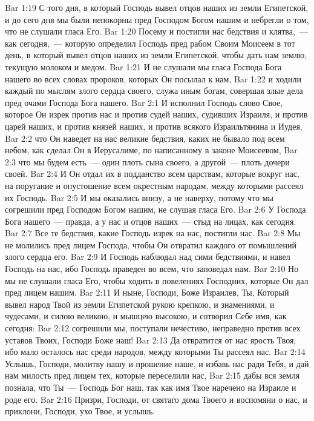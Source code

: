\vs Bar 1:19 С того дня, в который Господь вывел отцов наших из земли Египетской, и до сего дня мы были непокорны пред Господом Богом нашим и небрегли о том, что не слушали гласа Его.
\vs Bar 1:20 Посему и постигли нас бедствия и клятва,~--- как сегодня,~--- которую определил Господь пред рабом Своим Моисеем в тот день, в который вывел отцов наших из земли Египетской, чтобы дать нам землю, текущую молоком и медом.
\vs Bar 1:21 И не слушали мы гласа Господа Бога нашего во всех словах пророков, которых Он посылал к нам,
\vs Bar 1:22 и ходили каждый по мыслям злого сердца своего, служа иным богам, совершая злые дела пред очами Господа Бога нашего.
\vs Bar 2:1 И исполнил Господь слово Свое, которое Он изрек против нас и против судей наших, судивших Израиля, и против царей наших, и против князей наших, и против всякого Израильтянина и Иудея,
\vs Bar 2:2 что Он наведет на нас великие бедствия, каких не бывало под всем небом, как сделал Он в Иерусалиме, по написанному в законе Моисеевом,
\vs Bar 2:3 что мы будем есть~--- один плоть сына своего, а другой~--- плоть дочери своей.
\vs Bar 2:4 И Он отдал их в подданство всем царствам, которые вокруг нас, на поругание и опустошение всем окрестным народам, между которыми рассеял их Господь.
\vs Bar 2:5 И мы оказались внизу, а не наверху, потому что мы согрешили пред Господом Богом нашим, не слушая гласа Его.
\vs Bar 2:6 У Господа Бога нашего~--- правда, а у нас и отцов наших~--- стыд на лицах, как сегодня.
\vs Bar 2:7 Все те бедствия, какие Господь изрек на нас, постигли нас.
\vs Bar 2:8 Мы не молились пред лицем Господа, чтобы Он отвратил каждого от помышлений злого сердца его.
\vs Bar 2:9 И Господь наблюдал над сими бедствиями, и навел  Господь на нас, ибо Господь праведен во всем, что заповедал нам.
\vs Bar 2:10 Но мы не слушали гласа Его, чтобы ходить в повелениях Господних, которые Он дал пред лицем нашим.
\vs Bar 2:11 И ныне, Господи, Боже Израилев, Ты, Который вывел народ Твой из земли Египетской рукою крепкою, и знамениями, и чудесами, и силою великою, и мышцею высокою, и сотворил Себе имя, как сегодня:
\vs Bar 2:12 согрешили мы, поступали нечестиво, неправедно против всех уставов Твоих, Господи Боже наш!
\vs Bar 2:13 Да отвратится от нас ярость Твоя, ибо мало осталось нас среди народов, между которыми Ты рассеял нас.
\vs Bar 2:14 Услышь, Господи, молитву нашу и прошение наше, и избавь нас ради Тебя, и дай нам милость пред лицем тех, которые переселили нас,
\vs Bar 2:15 дабы вся земля познала, что Ты~--- Господь Бог наш, так как имя Твое наречено на Израиле и роде его.
\vs Bar 2:16 Призри, Господи, от святаго дома Твоего и воспомяни о нас, и приклони, Господи, ухо Твое, и услышь.
